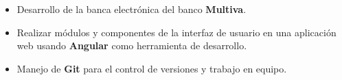 \documentclass[letterpaper]{twentysecondcv} %
\begin{document}
\divider

\begin{itemize}
	\item Desarrollo de la banca electrónica del banco \textbf{Multiva}.
	\item Realizar módulos y componentes de la interfaz de usuario en una aplicación web usando \textbf{Angular} como herramienta de desarrollo.
	\item Manejo de \textbf{Git} para el control de versiones y trabajo en equipo.
\end{itemize}







\end{document}
